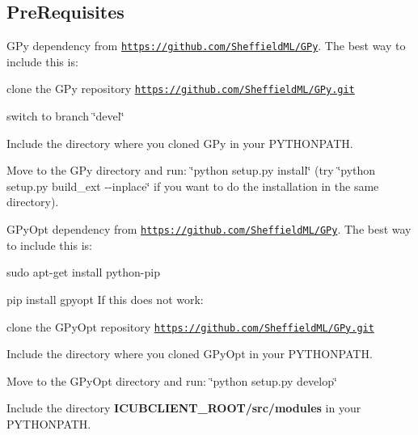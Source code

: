 \subsection*{Pre\+Requisites}


\begin{DoxyEnumerate}
\item G\+Py dependency from \href{https://github.com/SheffieldML/GPy}{\tt https\+://github.\+com/\+Sheffield\+M\+L/\+G\+Py}. The best way to include this is\+:
\begin{DoxyEnumerate}
\item clone the G\+Py repository \href{https://github.com/SheffieldML/GPy.git}{\tt https\+://github.\+com/\+Sheffield\+M\+L/\+G\+Py.\+git}
\item switch to branch \char`\"{}devel\char`\"{}
\item Include the directory where you cloned G\+Py in your P\+Y\+T\+H\+O\+N\+P\+A\+TH.
\item Move to the G\+Py directory and run\+: \char`\"{}python setup.\+py install\char`\"{} (try \char`\"{}python setup.\+py build\+\_\+ext -\/-\/inplace\char`\"{} if you want to do the installation in the same directory).
\end{DoxyEnumerate}
\item G\+Py\+Opt dependency from \href{https://github.com/SheffieldML/GPy}{\tt https\+://github.\+com/\+Sheffield\+M\+L/\+G\+Py}. The best way to include this is\+:
\begin{DoxyEnumerate}
\item sudo apt-\/get install python-\/pip
\item pip install gpyopt If this does not work\+:
\end{DoxyEnumerate}
\begin{DoxyEnumerate}
\item clone the G\+Py\+Opt repository \href{https://github.com/SheffieldML/GPy.git}{\tt https\+://github.\+com/\+Sheffield\+M\+L/\+G\+Py.\+git}
\item Include the directory where you cloned G\+Py\+Opt in your P\+Y\+T\+H\+O\+N\+P\+A\+TH.
\item Move to the G\+Py\+Opt directory and run\+: \char`\"{}python setup.\+py develop\char`\"{}
\end{DoxyEnumerate}
\item Include the directory {\bfseries I\+C\+U\+B\+C\+L\+I\+E\+N\+T\+\_\+\+R\+O\+O\+T/src/modules} in your P\+Y\+T\+H\+O\+N\+P\+A\+TH.
\end{DoxyEnumerate}

